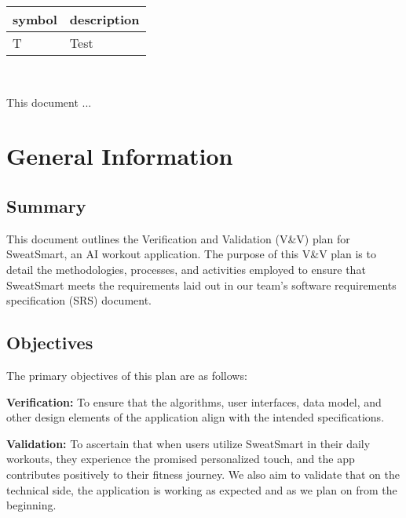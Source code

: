 \documentclass[12pt, titlepage]{article}
\begin{document}
\renewcommand{\arraystretch}{1.2}
\begin{tabular}{l l} 
  \toprule		
  \textbf{symbol} & \textbf{description}\\
  \midrule 
  T & Test\\
  \bottomrule
\end{tabular}\\



\newpage


This document ... 

\setlength\parindent{0pt}
\section{\textbf{General Information}}

\subsection{Summary}

This document outlines the Verification and Validation (V\&V) plan for SweatSmart, an AI workout application. The purpose of this V\&V plan is to detail the methodologies, processes, and activities employed to ensure that SweatSmart meets the requirements laid out in our team’s software requirements specification (SRS) document.

\subsection{Objectives}

The primary objectives of this plan are as follows: \newline

\textbf{Verification: }To ensure that the algorithms, user interfaces, data model, and other design elements of the application align with the intended specifications. \newline

\textbf{Validation: }To ascertain that when users utilize SweatSmart in their daily workouts, they experience the promised personalized touch, and the app contributes positively to their fitness journey. We also aim to validate that on the technical side, the application is working as expected and as we plan on from the beginning. \newline
\end{document}
